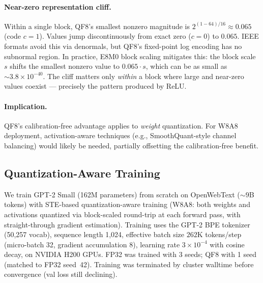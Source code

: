 \documentclass[11pt,letterpaper]{article}
\theoremstyle{definition}
\theoremstyle{remark}
\begin{document}
\paragraph{Near-zero representation cliff.}
Within a single block, QF8's smallest nonzero magnitude is
$2^{(1-64)/16} \approx 0.065$ (code $c=1$).
Values jump discontinuously from exact zero ($c=0$) to $0.065$.
IEEE formats avoid this via denormals, but QF8's fixed-point log encoding has
no subnormal region.
In practice, E8M0 block scaling mitigates this: the block scale $s$ shifts the
smallest nonzero value to $0.065 \cdot s$, which can be as small as
${\sim}3.8 \times 10^{-40}$.
The cliff matters only \emph{within} a block where large and near-zero values
coexist --- precisely the pattern produced by ReLU.

\paragraph{Implication.} QF8's calibration-free advantage applies to
\emph{weight} quantization.
For W8A8 deployment, activation-aware techniques (e.g., SmoothQuant-style
channel balancing) would likely be needed, partially offsetting the
calibration-free benefit.

\subsection{Quantization-Aware Training}
\label{subsec:qat}

We train GPT-2 Small (162M parameters) from scratch on OpenWebText
(${\sim}9$B tokens) with STE-based quantization-aware training (W8A8: both
weights and activations quantized via block-scaled round-trip at each forward
pass, with straight-through gradient estimation).
Training uses the GPT-2 BPE tokenizer (50{,}257 vocab), sequence length
1{,}024, effective batch size $262$K tokens/step (micro-batch 32, gradient
accumulation 8), learning rate $3 \times 10^{-4}$ with cosine decay, on NVIDIA
H200 GPUs.
FP32 was trained with 3 seeds; QF8 with 1 seed (matched to FP32 seed~42).
Training was terminated by cluster walltime before convergence (val loss still
declining).
\end{document}
